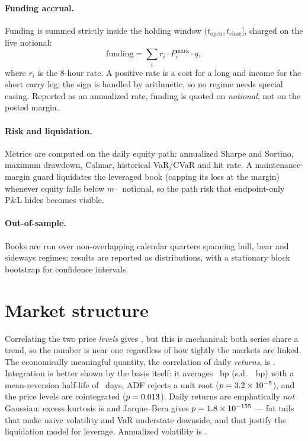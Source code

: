\documentclass[11pt]{article}
\begin{document}
\paragraph{Funding accrual.} Funding is summed strictly inside the holding window
$(t_{\text{open}}, t_{\text{close}}]$, charged on the live notional:
\[
\text{funding} = \sum_i r_i \cdot P^{\text{mark}}_i \cdot q,
\]
where $r_i$ is the 8-hour rate. A positive rate is a cost for a long and income for
the short carry leg; the sign is handled by arithmetic, so no regime needs special
casing. Reported as an annualized rate, funding is quoted on \emph{notional}, not
on the posted margin.

\paragraph{Risk and liquidation.} Metrics are computed on the daily equity path:
annualized Sharpe and Sortino, maximum drawdown, Calmar, historical VaR/CVaR and
hit rate. A maintenance-margin guard liquidates the leveraged book (capping its
loss at the margin) whenever equity falls below $m \cdot$ notional, so the path
risk that endpoint-only P\&L hides becomes visible.

\paragraph{Out-of-sample.} Books are run over \nQuarters{} non-overlapping
calendar quarters spanning bull, bear and sideways regimes; results are reported
as distributions, with a stationary block bootstrap for confidence intervals.

\section{Market structure}
Correlating the two price \emph{levels} gives \levelCorr{}, but this is mechanical:
both series share a trend, so the number is near one regardless of how tightly the
markets are linked. The economically meaningful quantity, the correlation of daily
\emph{returns}, is \returnCorr{}. Integration is better shown by the basis itself:
it averages \basisMean{}~bp (s.d.\ \basisStd{}~bp) with a mean-reversion half-life
of \basisHL{}~days, ADF rejects a unit root ($p = 3.2\times10^{-5}$), and the price levels are
cointegrated ($p = 0.013$). Daily returns are emphatically \emph{not} Gaussian:
excess kurtosis is \kurtosis{} and Jarque--Bera gives $p = 1.8\times10^{-155}$ --- fat tails that
make naive volatility and VaR understate downside, and that justify the liquidation
model for leverage. Annualized volatility is \annVol{}.
\end{document}
